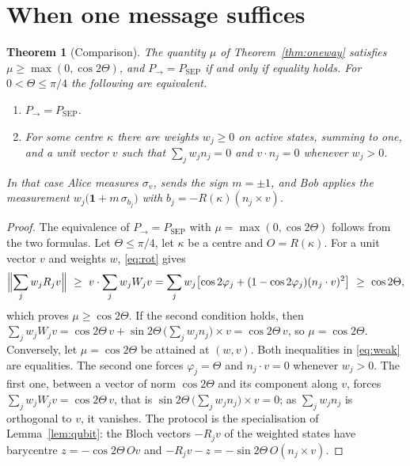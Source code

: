 \documentclass[11pt,a4paper]{article}
\newtheorem{theorem}{Theorem}
\theoremstyle{definition}
\theoremstyle{plain}
\newcommand{\one}{\mathbf{1}}
\newcommand{\Pow}{P_{\to}}
\newcommand{\Psep}{P_{\mathrm{SEP}}}
\begin{document}
\section{When one message suffices}\label{sec:compare}
\begin{theorem}[Comparison]\label{thm:compare}
The quantity $\mu$ of Theorem~\ref{thm:oneway} satisfies
$\mu\ge\max(0,\cos2\Theta)$, and $\Pow=\Psep$ if and only if equality holds.
For $0<\Theta\le\pi/4$ the following are equivalent.
\begin{enumerate}
\item $\Pow=\Psep$.
\item For some centre $\kappa$ there are weights $w_j\ge0$ on active states,
summing to one, and a unit vector $v$ such that $\sum_jw_jn_j=0$ and
$v\cdot n_j=0$ whenever $w_j>0$.
\end{enumerate}
In that case Alice measures $\sigma_v$, sends the sign $m=\pm1$, and Bob
applies the measurement $w_j\bigl(\one+m\,\sigma_{b_j}\bigr)$ with
$b_j=-R(\kappa)(n_j\times v)$.
\end{theorem}
\begin{proof}
The equivalence of $\Pow=\Psep$ with $\mu=\max(0,\cos2\Theta)$ follows from
the two formulas. Let $\Theta\le\pi/4$, let $\kappa$ be a centre and
$O=R(\kappa)$. For a unit vector $v$ and weights $w$, \eqref{eq:rot} gives
\begin{equation}\label{eq:weak}
\Bigl\lVert\sum_jw_jR_jv\Bigr\rVert\ \ge\ v\cdot\sum_jw_jW_jv
=\sum_jw_j\bigl[\cos2\varphi_j+(1-\cos2\varphi_j)(n_j\cdot v)^2\bigr]\ \ge\ \cos2\Theta ,
\end{equation}
which proves $\mu\ge\cos2\Theta$. If the second condition holds, then
$\sum_jw_jW_jv=\cos2\Theta\,v+\sin2\Theta\,\bigl(\sum_jw_jn_j\bigr)\times
v=\cos2\Theta\,v$, so $\mu=\cos2\Theta$. Conversely, let $\mu=\cos2\Theta$ be
attained at $(w,v)$. Both inequalities in \eqref{eq:weak} are equalities.
The second one forces $\varphi_j=\Theta$ and $n_j\cdot v=0$ whenever
$w_j>0$. The first one, between a vector of norm $\cos2\Theta$ and its
component along $v$, forces $\sum_jw_jW_jv=\cos2\Theta\,v$, that is
$\sin2\Theta\,\bigl(\sum_jw_jn_j\bigr)\times v=0$; as $\sum_jw_jn_j$ is
orthogonal to $v$, it vanishes. The protocol is the specialisation of
Lemma~\ref{lem:qubit}: the Bloch vectors $-R_jv$ of the weighted states have
barycentre $z=-\cos2\Theta\,Ov$ and
$-R_jv-z=-\sin2\Theta\,O(n_j\times v)$.
\end{proof}
\end{document}
